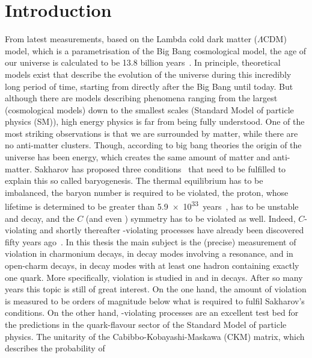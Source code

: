 
\chapter{Introduction}
\label{sec:Introduction}

From latest measurements, based on the Lambda cold dark matter ($\Lambda$CDM)
model, which is a parametrisation of the Big Bang cosmological
model,  the age of our universe is
calculated to be \num{13.8} billion years~\cite{Ade:2015xua}. In principle,
theoretical models exist that describe the evolution of the universe during
this incredibly long period of time, starting from directly after the Big Bang
until today. But although there are models describing phenomena ranging from
the largest (cosmological models) down to the smallest scales (Standard Model
of particle physics (SM)), high energy physics is far from being fully
understood. One of the most striking observations is that we are surrounded by
matter, while there are no anti-matter clusters. Though, according to big bang
theories the origin of the universe has been energy, which creates the same
amount of matter and anti-matter. Sakharov has proposed three
conditions~\cite{Sakharov:1967dj} that need to be fulfilled to explain this so
called baryogenesis. The thermal equilibrium has to be imbalanced, the baryon
number is required to be violated, \ie the proton, whose lifetime is
determined to be greater than \SI{5.9e33}{years}~\cite{Abe:2014mwa}, has to be
unstable and decay, and the $C$ (and even \CP) symmetry has to be violated as
well. Indeed, $C$-violating and shortly thereafter \CP-violating processes
have already been discovered fifty years ago~\cite{CPV_discovery}. In this
thesis the main subject is the (precise) measurement of \CP violation in
charmonium decays, \ie in decay modes involving a \ccbar resonance, and in
open-charm decays, \ie in decay modes with at least one hadron containing
exactly one \cquark quark. More specifically, \CP violation is studied in
\BdToJPsiKS and in \BdToDD decays. After so many years this topic is still of
great interest. On the one hand, the amount of \CP violation is measured to be
orders of magnitude below what is required to fulfil Sakharov's
conditions. On the other hand, \CP-violating processes are an
excellent test bed for the predictions in the quark-flavour sector of the
Standard Model of particle physics. The unitarity of the
Cabibbo-Kobayashi-Maskawa (CKM) matrix, which describes the probability of
